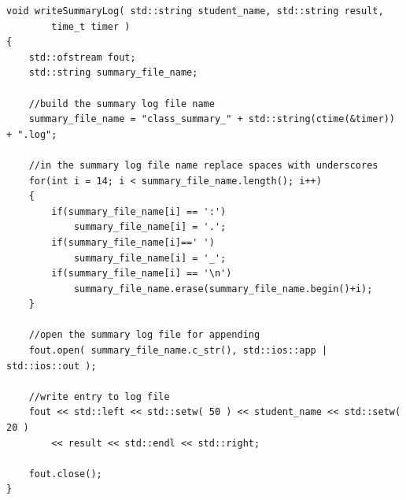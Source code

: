 \begin{lstlisting}
void writeSummaryLog( std::string student_name, std::string result,
        time_t timer )
{
    std::ofstream fout;
    std::string summary_file_name;

    //build the summary log file name
    summary_file_name = "class_summary_" + std::string(ctime(&timer)) + ".log";

    //in the summary log file name replace spaces with underscores
    for(int i = 14; i < summary_file_name.length(); i++)
    {
        if(summary_file_name[i] == ':')
            summary_file_name[i] = '.';
        if(summary_file_name[i]==' ')
            summary_file_name[i] = '_';
        if(summary_file_name[i] == '\n')
            summary_file_name.erase(summary_file_name.begin()+i);
    }

    //open the summary log file for appending
    fout.open( summary_file_name.c_str(), std::ios::app | std::ios::out );

    //write entry to log file
    fout << std::left << std::setw( 50 ) << student_name << std::setw( 20 )
        << result << std::endl << std::right;

    fout.close();
}
\end{lstlisting}
